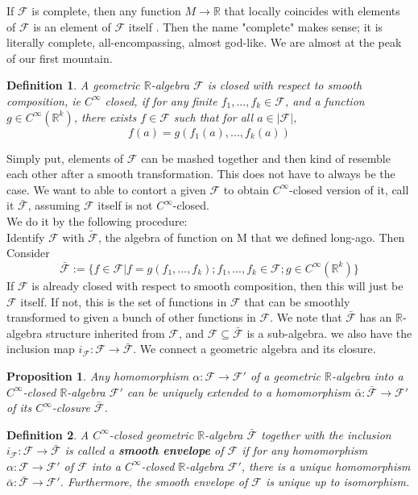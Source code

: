 \documentclass[12pt]{extarticle}
\newcommand\Reals{{\mathbb{R}}}
\newcommand{\ff}{\mathcal{F}}
\newtheorem{definition}{Definition}
\newtheorem{proposition}[theorem]{Proposition}
\begin{document}
If $\ff$ is complete, then any function $M\to\Reals$ that locally coincides with elements of $\ff$ is an element of $\ff$ itself \cite{nestruev}. Then the name "complete" makes sense; it is literally complete, all-encompassing, almost god-like. We are almost at the peak of our first mountain.
\begin{definition}
A geometric $\Reals$-algebra $\ff$ is closed with respect to smooth composition, ie $C^\infty$ closed, if for any finite $f_1,...,f_k\in\ff$, and a function $g\in C^\infty(\Reals^k)$, there exists $f\in\ff$ such that for all $a\in |\ff|$,
\begin{equation}
f(a)=g(f_1(a),...,f_k(a))
\end{equation}
\end{definition}
Simply put, elements of $\ff$ can be mashed together and then kind of resemble each other after a smooth transformation. This does not have to always be the case. We want to able to contort a given $\ff$ to obtain  $C^\infty$-closed version of it, call it $\bar{\ff}$, assuming $\ff$ itself is not $C^\infty$-closed.\\
We do it by the following procedure:\\
Identify $\ff$ with $\tilde{\ff}$, the algebra of function on M that we defined long-ago. Then Consider
\begin{equation}
\bar{\ff} := \{f\in\ff|f=g(f_1,...,f_k); f_1,...,f_k\in\ff; g\in C^\infty(\Reals^k)\}
\end{equation}
If $\ff$ is already closed with respect to smooth composition, then this will just be $\ff$ itself. If not, this is the set of functions in $\ff$ that can be smoothly transformed to given a bunch of other functions in $\ff$. We note that $\bar{\ff}$ has an $\Reals$-algebra structure inherited from $\ff$, and $\ff\subseteq\bar{\ff}$ is a sub-algebra. we also have the inclusion map $i_\ff: \ff\to\bar{\ff}$. We connect a geometric algebra and its closure.
\begin{proposition}
Any homomorphism $\alpha:\ff\to\ff'$ of a geometric $\Reals$-algebra into a $C^\infty$-closed $\Reals$-algebra $\ff'$ can be uniquely extended to a homomorphism $\bar{\alpha}:\bar{\ff}\to\ff'$ of its $C^\infty$-closure $\bar{\ff}$.
\end{proposition}
\begin{definition}
A $C^\infty$-closed geometric $\Reals$-algebra $\bar{\ff}$ together with the inclusion $i_\ff:\ff\to\bar{\ff}$ is called a \textbf{smooth envelope} of $\ff$ if for any homomorphism $\alpha:\ff\to\ff'$ of $\ff$ into a $C^\infty$-closed $\Reals$-algebra $\ff'$, there is a unique homomorphism $\bar{\alpha}:\bar{\ff}\to\ff'$. Furthermore, the smooth envelope of $\ff$ is unique up to isomorphism.
\end{definition}
\end{document}
